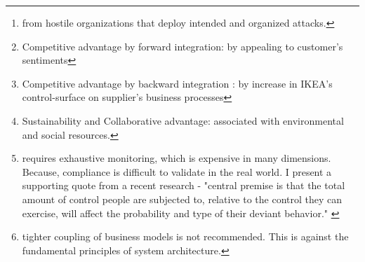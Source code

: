 \documentclass[a4paper, 11pt, margin=1in]{article}
\begin{document}
\renewcommand{\abstractname}{Executive Summary}
\begin{abstract}
\textbf{Short term action:}conduct recurring meetings with Venkat to reach \textbf{mutual agreement}. The agreement would list the top three concerns that resist compliance with IWAY. \textbf{Finer point:}The process of mutual agree must be based on mutual respect and it must not be founded on the ideas of exerting purchasing power to force Venkat into compliance. \cite{tittle2018control} \\\textbf{Long term strategy:} IWAY policies and practices should be revised to work with consortiums to nutralize threat to IKEA's value chain.\footnote{ from hostile organizations that deploy intended and organized attacks.} \cite{publichearing1998}\\
There are \textbf{three main benefits} of redefined relationship between IKEA and its suppliers - \\
\begin{enumerate*}
 \item \textbf{Brand-Image Improved}\footnote{Competitive advantage by forward integration: by appealing to customer's sentiments} ,
 \item \textbf{Cost Savings Improved}\footnote{Competitive advantage by backward integration : by increase in IKEA's control-surface on supplier's business processes},
 \item \textbf{Improved management of risks}\footnote{Sustainability and Collaborative advantage: associated with environmental and social resources.}
\end{enumerate*} \\
Three main concerns that can be raised are - \\
\begin{enumerate*}
 \item \textbf{New cost} to meet the requirements of strict compliance.\footnote{ requires exhaustive monitoring, which is expensive in many dimensions. Because, compliance is difficult to validate in the real world. I present a supporting quote from a recent research - "central premise is that the total amount of control people are subjected to, relative to the control they can exercise, will affect the probability and type of their deviant behavior." \cite{tittle2018control}}
 \item \textbf{Threat to sales:}stronger control on suppliers would affect IKEA's business. \footnote{tighter coupling of business models is not recommended. This is against the fundamental  principles of system architecture.}
 \item \textbf{Accounting liability:}IKEA's business model is tightly coupled with geopolitical dynamics. This is a huge accounting liability in terms of potential litigations.
\end{enumerate*}
\end{abstract}
\end{document}
